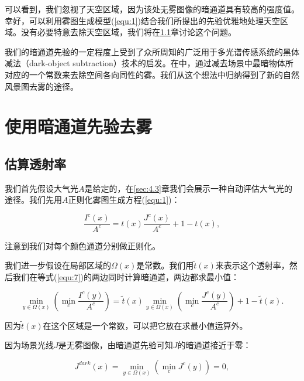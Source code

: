 \documentclass{ctexart}
\begin{document}
可以看到，我们忽视了天空区域，因为该处无雾图像的暗通道具有较高的强度值。幸好，可以利用雾图生成模型(\ref{equ:1})结合我们所提出的先验优雅地处理天空区域。没有必要特意去除天空区域，我们将在\ref{sec:4.1}章讨论这个问题。\par

我们的暗通道先验的一定程度上受到了众所周知的广泛用于多光谱传感系统的黑体减法（dark-object subtraction）技术\cite{Chavez1988}的启发。在\cite{Chavez1988}中，通过减去场景中最暗物体所对应的一个常数来去除空间各向同性的雾。我们从这个想法中归纳得到了新的自然风景图去雾的途径。\par



\section{使用暗通道先验去雾}

\subsection{估算透射率}\label{sec:4.1}
我们首先假设大气光$A$是给定的，在\ref{sec:4.3}章我们会展示一种自动评估大气光的途径。我们先用$A$正则化雾图生成方程(\ref{equ:1})：

\begin{equation}\label{equ:7}
	\frac{I^c(x)}{A^c} = t(x)\frac{J^c(x)}{A^c}  + 1 - t(x),
\end{equation}

注意到我们对每个颜色通道分别做正则化。\par

我们进一步假设在局部区域的$\Omega(x)$是常数。我们用$\tilde{t}(x)$来表示这个透射率，然后我们在等式(\ref{equ:7})的两边同时计算暗通道，两边都求最小值：

\begin{equation}\label{equ:8}
	\min_{y \in \Omega(x)} (\min_c \frac{I^c(y)}{A^c}) = \tilde{t}(x) \min_{y \in \Omega(x)} (\min_c \frac{J^c(y)}{A^c}) + 1 - \tilde{t}(x).
\end{equation}

因为$\tilde{t}(x)$在这个区域是一个常数，可以把它放在求最小值运算外。\par

因为场景光线$J$是无雾图像，由暗通道先验可知$J$的暗通道接近于零：

\begin{equation}\label{equ:9}
	J^{dark}(x) = \min_{y \in \Omega(x)} (\min_c J^c(y)) = 0,
\end{equation}
\end{document}
